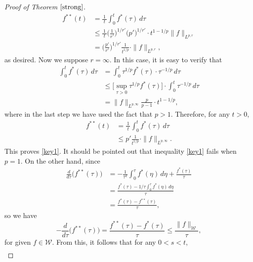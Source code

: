 \documentclass{birkjour}
\theoremstyle{definition}
\theoremstyle{remark}
\numberwithin{equation}{section}
\begin{document}
\begin{proof}[Proof of Theorem $\ref{strong}$]
\begin{equation*}
\begin{split}
f^{**}(t)&=\frac{\,1\,}{t}\int_0^{t}f^{*}(\tau)\,d\tau\\
&\leq\frac{\,1\,}{t}\Big(\frac{1}{r'}\Big)^{1/{r'}}\big(p'\big)^{1/{r'}}
\cdot t^{1-1/p}\|f\|_{L^{p,r}}\\
&=\Big(\frac{p'}{r'}\Big)^{1/{r'}}\frac{1}{t^{1/p}}\cdot\|f\|_{L^{p,r}},
\end{split}
\end{equation*}
as desired. Now we suppose $r=\infty$. In this case, it is easy to verify that
\begin{equation*}
\begin{split}
\int_0^{t}f^{*}(\tau)\,d\tau&=\int_0^{t}\tau^{1/p}f^{*}(\tau)\cdot\tau^{-1/p}\,{d\tau}\\
&\leq\Big[\sup_{\tau>0}\tau^{1/p}f^{*}(\tau)\Big]\cdot\int_0^{t}\tau^{-1/p}\,{d\tau}\\
&=\|f\|_{L^{p,\infty}}\frac{p}{p-1}\cdot t^{1-1/p},
\end{split}
\end{equation*}
where in the last step we have used the fact that $p>1$. Therefore, for any $t>0$,
\begin{equation*}
\begin{split}
f^{**}(t)&=\frac{\,1\,}{t}\int_0^{t}f^{*}(\tau)\,d\tau\\
&\leq p'\frac{1}{t^{1/p}}\cdot\|f\|_{L^{p,\infty}}.
\end{split}
\end{equation*}
This proves \eqref{key1}. It should be pointed out that inequality \eqref{key1} fails when $p=1$. On the other hand, since
\begin{equation}\label{important}
\begin{split}
\frac{d}{d\tau}\big(f^{**}(\tau)\big)&=-\frac{1}{\tau^2}\int_0^{\tau}f^{*}(\eta)\,d\eta+\frac{f^{*}(\tau)}{\tau}\\
&=\frac{f^{*}(\tau)-1/{\tau}\int_0^{\tau}f^{*}(\eta)\,d\eta}{\tau}\\
&=\frac{f^{*}(\tau)-f^{**}(\tau)}{\tau},
\end{split}
\end{equation}
so we have
\begin{equation*}
-\frac{d}{d\tau}\big(f^{**}(\tau)\big)=\frac{f^{**}(\tau)-f^{*}(\tau)}{\tau}\leq\frac{\|f\|_{\mathcal{W}}}{\tau},
\end{equation*}
for given $f\in \mathcal{W}$. From this, it follows that for any $0<s<t$,
\begin{equation*}
\begin{split}

\end{split}
\end{equation*}
\end{proof}
\end{document}
